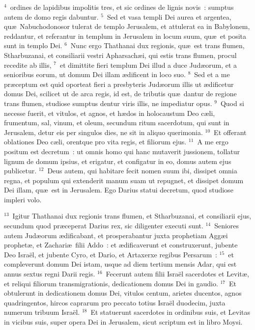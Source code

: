 ${}^{4}$~ordines de lapidibus impolitis tres, et sic ordines de lignis novis~: sumptus autem de domo regis dabuntur.
${}^{5}$~Sed et vasa templi Dei aurea et argentea, qu\ae\ Nabuchodonosor tulerat de templo Jerusalem, et attulerat ea in Babylonem, reddantur, et referantur in templum in Jerusalem in locum suum, qu\ae\ et posita sunt in templo Dei.
${}^{6}$~Nunc ergo Thathanai dux regionis, qu\ae\ est trans flumen, Stharbuzanai, et consiliarii vestri Apharsach\ae i, qui estis trans flumen, procul recedite ab illis,
${}^{7}$~et dimittite fieri templum Dei illud a duce Jud\ae orum, et a senioribus eorum, ut domum Dei illam \ae dificent in loco suo.
${}^{8}$~Sed et a me pr\ae ceptum est quid oporteat fieri a presbyteris Jud\ae orum illis ut \ae dificetur domus Dei, scilicet ut de arca regis, id est, de tributis qu\ae\ dantur de regione trans flumen, studiose sumptus dentur viris illis, ne impediatur opus.
${}^{9}$~Quod si necesse fuerit, et vitulos, et agnos, et h\ae dos in holocaustum Deo c\ae li, frumentum, sal, vinum, et oleum, secundum ritum sacerdotum, qui sunt in Jerusalem, detur eis per singulos dies, ne sit in aliquo querimonia.
${}^{10}$~Et offerant oblationes Deo c\ae li, orentque pro vita regis, et filiorum ejus.
${}^{11}$~A me ergo positum est decretum~: ut omnis homo qui hanc mutaverit jussionem, tollatur lignum de domum ipsius, et erigatur, et configatur in eo, domus autem ejus publicetur.
${}^{12}$~Deus autem, qui habitare fecit nomen suum ibi, dissipet omnia regna, et populum qui extenderit manum suam ut repugnet, et dissipet domum Dei illam, qu\ae\ est in Jerusalem. Ego Darius statui decretum, quod studiose impleri volo.


${}^{13}$~Igitur Thathanai dux regionis trans flumen, et Stharbuzanai, et consiliarii ejus, secundum quod pr\ae ceperat Darius rex, sic diligenter executi sunt.
${}^{14}$~Seniores autem Jud\ae orum \ae dificabant, et prosperabantur juxta prophetiam Agg\ae i prophet\ae , et Zachari\ae\ filii Addo~: et \ae dificaverunt et construxerunt, jubente Deo Isra\"el, et jubente Cyro, et Dario, et Artaxerxe regibus Persarum~:
${}^{15}$~et compleverunt domum Dei istam, usque ad diem tertium mensis Adar, qui est annus sextus regni Darii regis.
${}^{16}$~Fecerunt autem filii Isra\"el sacerdotes et Levit\ae , et reliqui filiorum transmigrationis, dedicationem domus Dei in gaudio.
${}^{17}$~Et obtulerunt in dedicationem domus Dei, vitulos centum, arietes ducentos, agnos quadringentos, hircos caprarum pro peccato totius Isra\"el duodecim, juxta numerum tribuum Isra\"el.
${}^{18}$~Et statuerunt sacerdotes in ordinibus suis, et Levitas in vicibus suis, super opera Dei in Jerusalem, sicut scriptum est in libro Moysi.


